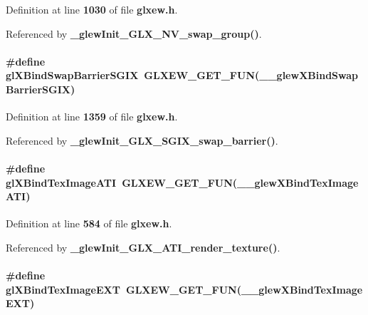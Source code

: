 Definition at line {\bf 1030} of file {\bf glxew.\+h}.



Referenced by {\bf \+\_\+glew\+Init\+\_\+\+G\+L\+X\+\_\+\+N\+V\+\_\+swap\+\_\+group()}.

\paragraph[{gl\+X\+Bind\+Swap\+Barrier\+S\+G\+IX}]{\setlength{\rightskip}{0pt plus 5cm}\#define gl\+X\+Bind\+Swap\+Barrier\+S\+G\+IX~{\bf G\+L\+X\+E\+W\+\_\+\+G\+E\+T\+\_\+\+F\+UN}({\bf \+\_\+\+\_\+glew\+X\+Bind\+Swap\+Barrier\+S\+G\+IX})}\label{glxew_8h_adffa4bb5733b5b2898a16872b120b9e4}


Definition at line {\bf 1359} of file {\bf glxew.\+h}.



Referenced by {\bf \+\_\+glew\+Init\+\_\+\+G\+L\+X\+\_\+\+S\+G\+I\+X\+\_\+swap\+\_\+barrier()}.

\paragraph[{gl\+X\+Bind\+Tex\+Image\+A\+TI}]{\setlength{\rightskip}{0pt plus 5cm}\#define gl\+X\+Bind\+Tex\+Image\+A\+TI~{\bf G\+L\+X\+E\+W\+\_\+\+G\+E\+T\+\_\+\+F\+UN}({\bf \+\_\+\+\_\+glew\+X\+Bind\+Tex\+Image\+A\+TI})}\label{glxew_8h_a7fe46e579a4082199ffda9f302c949fd}


Definition at line {\bf 584} of file {\bf glxew.\+h}.



Referenced by {\bf \+\_\+glew\+Init\+\_\+\+G\+L\+X\+\_\+\+A\+T\+I\+\_\+render\+\_\+texture()}.

\paragraph[{gl\+X\+Bind\+Tex\+Image\+E\+XT}]{\setlength{\rightskip}{0pt plus 5cm}\#define gl\+X\+Bind\+Tex\+Image\+E\+XT~{\bf G\+L\+X\+E\+W\+\_\+\+G\+E\+T\+\_\+\+F\+UN}({\bf \+\_\+\+\_\+glew\+X\+Bind\+Tex\+Image\+E\+XT})}\label{glxew_8h_ab32a90f5a8898177f09f5c60ee8f9f0a}


